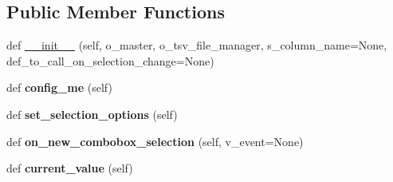 \subsection*{Public Member Functions}
\begin{DoxyCompactItemize}
\item 
def \hyperlink{classnegui_1_1pgneestimationtableselectioncombo_1_1PGNeEstTableSelectionCombo_a4a853212a79b503698285c61bf8402f9}{\+\_\+\+\_\+init\+\_\+\+\_\+} (self, o\+\_\+master, o\+\_\+tsv\+\_\+file\+\_\+manager, s\+\_\+column\+\_\+name=None, def\+\_\+to\+\_\+call\+\_\+on\+\_\+selection\+\_\+change=None)
\item 
def {\bfseries config\+\_\+me} (self)\hypertarget{classnegui_1_1pgneestimationtableselectioncombo_1_1PGNeEstTableSelectionCombo_a896e448cd14e9a4b8daaf7e599f48f7b}{}\label{classnegui_1_1pgneestimationtableselectioncombo_1_1PGNeEstTableSelectionCombo_a896e448cd14e9a4b8daaf7e599f48f7b}

\item 
def {\bfseries set\+\_\+selection\+\_\+options} (self)\hypertarget{classnegui_1_1pgneestimationtableselectioncombo_1_1PGNeEstTableSelectionCombo_a59dfba6354e1a2a427421d2580c07692}{}\label{classnegui_1_1pgneestimationtableselectioncombo_1_1PGNeEstTableSelectionCombo_a59dfba6354e1a2a427421d2580c07692}

\item 
def {\bfseries on\+\_\+new\+\_\+combobox\+\_\+selection} (self, v\+\_\+event=None)\hypertarget{classnegui_1_1pgneestimationtableselectioncombo_1_1PGNeEstTableSelectionCombo_aaab4a3ca0e179d31131c6c8333b7b4bb}{}\label{classnegui_1_1pgneestimationtableselectioncombo_1_1PGNeEstTableSelectionCombo_aaab4a3ca0e179d31131c6c8333b7b4bb}

\item 
def {\bfseries current\+\_\+value} (self)\hypertarget{classnegui_1_1pgneestimationtableselectioncombo_1_1PGNeEstTableSelectionCombo_a80c10be8aa9c92babba9db684d474401}{}\label{classnegui_1_1pgneestimationtableselectioncombo_1_1PGNeEstTableSelectionCombo_a80c10be8aa9c92babba9db684d474401}

\end{DoxyCompactItemize}
